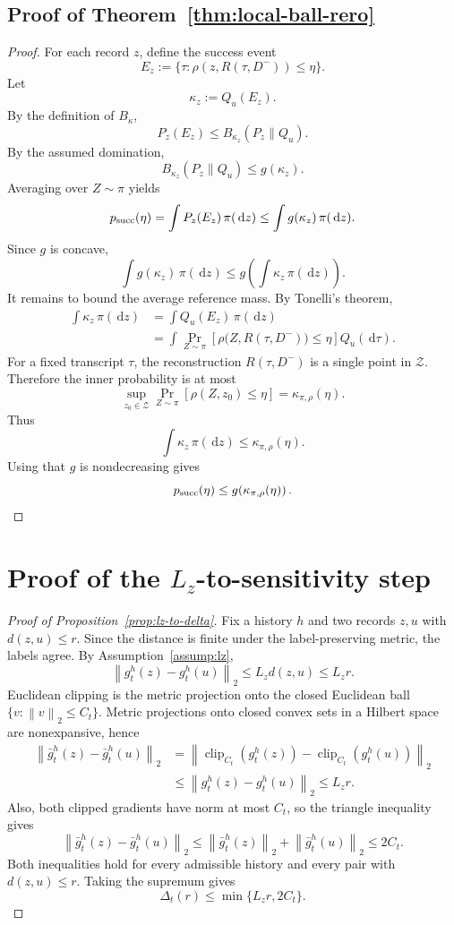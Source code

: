 \documentclass[conference,compsoc]{IEEEtran}
\DeclareMathOperator{\clip}{clip}
\newcommand{\cZ}{\mathcal{Z}}
\newcommand{\dd}{\,\mathrm d}
\newcommand{\norm}[1]{\left\lVert #1\right\rVert}
\begin{document}
\subsection{Proof of Theorem~\ref{thm:local-ball-rero}}

\begin{proof}
For each record $z$, define the success event
\[
E_z:=\{\tau:\rho(z,R(\tau,D^-))\le\eta\}.
\]
Let
\[
\kappa_z:=Q_u(E_z).
\]
By the definition of $B_\kappa$,
\[
P_z(E_z)\le B_{\kappa_z}(P_z\|Q_u).
\]
By the assumed domination,
\[
B_{\kappa_z}(P_z\|Q_u)
\le
 g(\kappa_z).
\]
Averaging over $Z\sim\pi$ yields
\[
p_{\rm succ}(\eta)
=
\int P_z(E_z)\,\pi(\dd z)
\le
\int g(\kappa_z)\,\pi(\dd z).
\]
Since $g$ is concave,
\[
\int g(\kappa_z)\,\pi(\dd z)
\le
 g\!\left(\int \kappa_z\,\pi(\dd z)\right).
\]
It remains to bound the average reference mass.  By Tonelli's theorem,
\begin{align*}
\int \kappa_z\,\pi(\dd z)
&=
\int Q_u(E_z)\,\pi(\dd z)\\
&=
\int
\Pr_{Z\sim\pi}\!\left[\rho\bigl(Z,R(\tau,D^-)\bigr)\le\eta\right]
Q_u(\dd\tau).
\end{align*}
For a fixed transcript $\tau$, the reconstruction $R(\tau,D^-)$ is a single
point in $\cZ$.  Therefore the inner probability is at most
\[
\sup_{z_0\in\cZ}
\Pr_{Z\sim\pi}\left[\rho(Z,z_0)\le\eta\right]
=
\kappa_{\pi,\rho}(\eta).
\]
Thus
\[
\int \kappa_z\,\pi(\dd z)\le\kappa_{\pi,\rho}(\eta).
\]
Using that $g$ is nondecreasing gives
\[
p_{\rm succ}(\eta)
\le
 g\!\left(\kappa_{\pi,\rho}(\eta)\right).
\]
\end{proof}

\section{Proof of the \texorpdfstring{$L_z$}{Lz}-to-sensitivity step}
\label{app:lz-to-delta-proof}

\begin{proof}[Proof of Proposition~\ref{prop:lz-to-delta}]
Fix a history $h$ and two records $z,u$ with $d(z,u)\le r$.  Since the distance
is finite under the label-preserving metric, the labels agree.  By
Assumption~\ref{assump:lz},
\[
\norm{g_t^h(z)-g_t^h(u)}_2
\le
L_z d(z,u)
\le
L_z r.
\]
Euclidean clipping is the metric projection onto the closed Euclidean ball
$\{v:\norm{v}_2\le C_t\}$.  Metric projections onto closed convex sets in a
Hilbert space are nonexpansive, hence
\begin{align*}
\norm{\bar g_t^h(z)-\bar g_t^h(u)}_2
&=
\norm{\clip_{C_t}(g_t^h(z))-\clip_{C_t}(g_t^h(u))}_2\\
&\le
\norm{g_t^h(z)-g_t^h(u)}_2
\le
L_zr.
\end{align*}
Also, both clipped gradients have norm at most $C_t$, so the triangle
inequality gives
\[
\norm{\bar g_t^h(z)-\bar g_t^h(u)}_2
\le
\norm{\bar g_t^h(z)}_2+
\norm{\bar g_t^h(u)}_2
\le
2C_t.
\]
Both inequalities hold for every admissible history and every pair with
$d(z,u)\le r$.  Taking the supremum gives
\[
\Delta_t(r)\le\min\{L_zr,2C_t\}.
\]
\end{proof}
\end{document}
